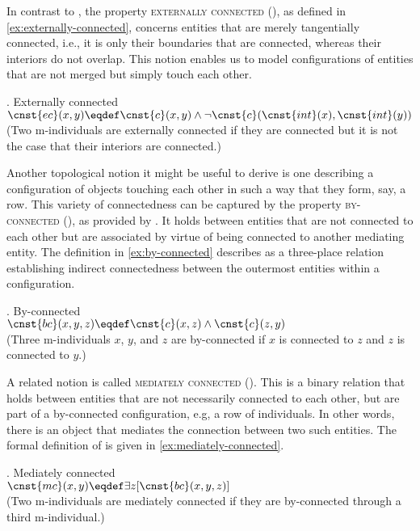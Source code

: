 In contrast to , the property \textsc{externally connected} (), as defined in \ref{ex:externally-connected}, concerns entities that are merely tangentially connected, i.e., it is only their boundaries that are connected, whereas their interiors do not overlap. This notion enables us to model configurations of entities that are not merged but simply touch each other.

\ex. Externally connected \citep[p. 134; adapted]{grimm2012number}\label{ex:externally-connected}\\
$\cnst{ec}(x,y) \eqdef \cnst{c}(x,y) \wedge \neg \cnst{c}(\cnst{int}(x),\cnst{int}(y))$\\
(Two m-individuals are externally connected if they are connected but it is not the case that their interiors are connected.)

Another topological notion it might be useful to derive is one describing a configuration of objects touching each other in such a way that they form, say, a row. This variety of connectedness can be captured by the property \textsc{by-connected} (), as provided by \citet{varzi2007spatial}. It holds between entities that are not connected to each other but are associated by virtue of being connected to another mediating entity. The definition in \ref{ex:by-connected} describes  as a three-place relation establishing indirect connectedness between the outermost entities within a configuration.

\ex. By-connected \citep[p. 979; adapted]{varzi2007spatial}\label{ex:by-connected}\\
$\cnst{bc}(x,y,z) \eqdef \cnst{c}(x,z) \wedge \cnst{c}(z,y)$\\
(Three m-individuals $x$, $y$, and $z$ are by-connected if $x$ is connected to $z$ and $z$ is connected to $y$.)

A related notion is called \textsc{mediately connected} (). This is a binary relation that holds between entities that are not necessarily connected to each other, but are part of a by-connected configuration, e.g, a row of individuals. In other words, there is an object that mediates the connection between two such entities. The formal definition of  is given in \ref{ex:mediately-connected}.

\ex. Mediately connected \citep[p. 979; adapted]{varzi2007spatial}\label{ex:mediately-connected}\\
$\cnst{mc}(x,y) \eqdef \exists z [\cnst{bc}(x,y,z)]$\\
(Two m-individuals are mediately connected if they are by-connected through a third m-individual.)

